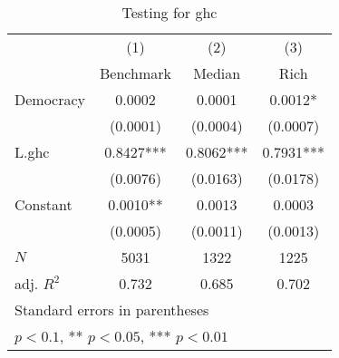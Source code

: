 \begin{table}[htbp]\centering
\def\sym#1{\ifmmode^{#1}\else\(^{#1}\)\fi}
\caption{Testing for ghc \label{tab:regression7}}
\begin{tabular}{l*{3}{c}}
\hline\hline
            &\multicolumn{1}{c}{(1)}&\multicolumn{1}{c}{(2)}&\multicolumn{1}{c}{(3)}\\
            &\multicolumn{1}{c}{Benchmark}&\multicolumn{1}{c}{Median}&\multicolumn{1}{c}{Rich}\\
\hline
Democracy   &      0.0002   &      0.0001   &      0.0012*  \\
            &    (0.0001)   &    (0.0004)   &    (0.0007)   \\
[1em]
L.ghc       &      0.8427***&      0.8062***&      0.7931***\\
            &    (0.0076)   &    (0.0163)   &    (0.0178)   \\
[1em]
Constant    &      0.0010** &      0.0013   &      0.0003   \\
            &    (0.0005)   &    (0.0011)   &    (0.0013)   \\
\hline
\(N\)       &        5031   &        1322   &        1225   \\
adj. \(R^{2}\)&       0.732   &       0.685   &       0.702   \\
\hline\hline
\multicolumn{4}{l}{\footnotesize Standard errors in parentheses}\\
\multicolumn{4}{l}{\footnotesize * \(p<0.1\), ** \(p<0.05\), *** \(p<0.01\)}\\
\end{tabular}
\end{table}
